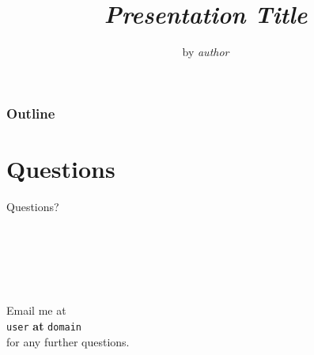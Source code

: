 \documentclass{beamer}
\title{\emph{Presentation Title}}
\author{by \emph{author}}
\date{}
\begin{document}
\begin{frame}
\titlepage
\end{frame}

\begin{frame}
\frametitle{Outline}
\tableofcontents
\end{frame}



%


\section*{Questions}
\begin{frame}
\begin{center}
\begin{Large}Questions?\end{Large}
$ $\\
$ $\\
$ $\\
$ $\\
$ $\\
Email me at \\
\texttt{user} \textbf{at} \texttt{domain}\\
for any further questions.
\end{center}
\end{frame}
\end{document}
